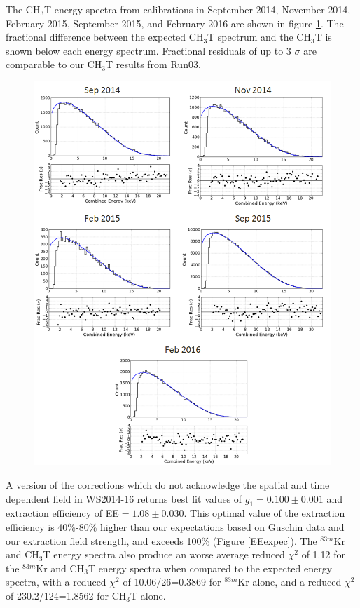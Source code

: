 The CH$_3$T energy spectra from calibrations in September 2014, November 2014, February 2015, September 2015, and February 2016 are shown in figure \ref{Kr2p22_H3E}.  The fractional difference between the expected CH$_3$T spectrum and the CH$_3$T is shown below each energy spectrum.  Fractional residuals of up to 3 $\sigma$ are comparable to our CH$_3$T results from Run03.


\begin{figure}
\includegraphics[scale=0.4]{Run04Corrections/KrypCal_2p22_AllCH3TEnergy.png}
 \label{Kr2p22_H3E}
\end{figure}


A version of the corrections which do not acknowledge the spatial and time dependent field in WS2014-16 returns best fit values of $g_1=0.100 \pm 0.001$ and extraction efficiency of EE$=1.08 \pm 0.030$.  This optimal value of the extraction efficiency is 40\%-80\% higher than our expectations based on Guschin data and our extraction field strength, and exceeds 100\% (Figure \ref{EEexpec}).  The $^{83m}$Kr and CH$_3$T energy spectra also produce an worse average reduced $\chi^2$ of 1.12 for the $^{83m}$Kr and CH$_3$T energy spectra when compared to the expected energy spectra, with a reduced $\chi^2$ of 10.06/26=0.3869 for $^{83m}$Kr alone, and a reduced $\chi^2$ of 230.2/124=1.8562 for CH$_3$T alone. 

